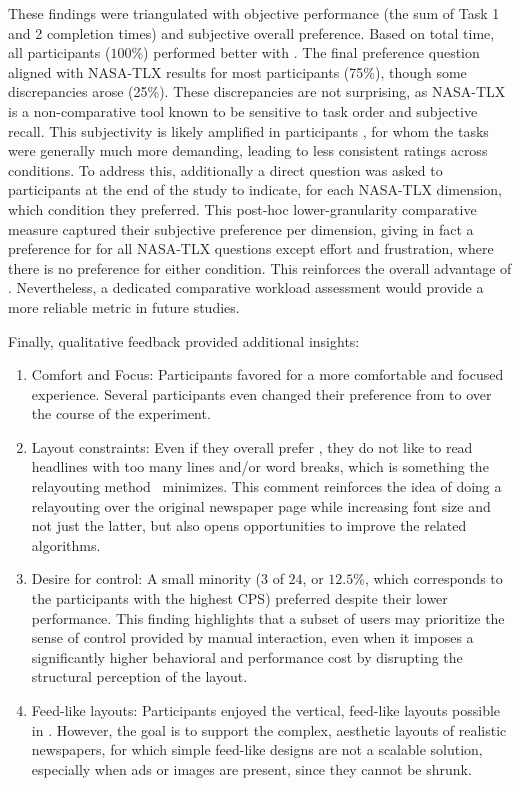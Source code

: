 These findings were triangulated with objective performance (the sum of Task 1 and 2 completion times) and subjective overall preference. Based on total time, all participants ($100\%$) performed better with \condtwonot. The final preference question aligned with NASA-TLX results for most participants (75\%), though some discrepancies arose (25\%). These discrepancies are not surprising, as NASA-TLX is a non-comparative tool known to be sensitive to task order and subjective recall. This subjectivity is likely amplified in participants \LV, for whom the tasks were generally much more demanding, leading to less consistent ratings across conditions. To address this, additionally a direct question was asked to participants \LV at the end of the study to indicate, for each NASA-TLX dimension, which condition they preferred. This post-hoc lower-granularity comparative measure captured their subjective preference per dimension, giving in fact a preference for \condtwonot for all NASA-TLX questions except effort and frustration, where there is no preference for either condition. This reinforces the overall advantage of \condtwonot. Nevertheless, a dedicated comparative workload assessment would provide a more reliable metric in future studies. 

Finally, qualitative feedback provided additional insights:
\begin{enumerate}
    \item Comfort and Focus: Participants favored \condtwonot for a more comfortable and focused experience. Several participants \LV even changed their preference from \condonenot to \condtwonot over the course of the experiment.

    \item Layout constraints: Even if they overall prefer \condtwonot, they do not like to read headlines with too many lines and/or word breaks, which is something the relayouting method~ minimizes. This comment reinforces the idea of doing a relayouting over the original newspaper page while increasing font size and not just the latter, but also opens opportunities to improve the related algorithms.

    \item Desire for control: A small minority ($3$ of $24$, or $12.5\%$, which corresponds to the participants with the highest CPS) preferred \condonenot despite their lower performance. This finding highlights that a subset of users may prioritize the sense of control provided by manual interaction, even when it imposes a significantly higher behavioral and performance cost by disrupting the structural perception of the layout.

    \item Feed-like layouts: Participants enjoyed the vertical, feed-like layouts possible in \condtwonot. However, the goal is to support the complex, aesthetic layouts of realistic newspapers, for which simple feed-like designs are not a scalable solution, especially when ads or images are present, since they cannot be shrunk.

\end{enumerate}


